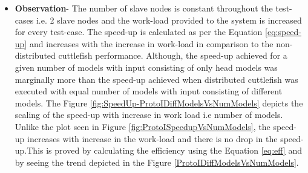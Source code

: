 \begin{enumerate}
\begin{itemize}
\item{\textbf{Observation}}-  The number of slave nodes is constant throughout the test-cases i.e. 2 slave nodes and the work-load provided to the system is increased for every test-case. The speed-up is calculated as per the Equation \ref{eq:speed-up} and increases with the increase in work-load in comparison to the non-distributed cuttlefish performance. Although, the speed-up achieved for a given number of models with input consisting of only head models was marginally more than the speed-up achieved when distributed cuttlefish was executed with equal number of models with input consisting of different models. The Figure \ref{fig:SpeedUp-ProtoIDiffModelsVsNumModels} depicts the scaling of the speed-up with increase in work load i.e number of models. Unlike the plot seen in Figure \ref{fig:ProtoISpeedupVsNumModels}, the speed-up increases with increase in the work-load and there is no drop in the speed-up.This is proved by calculating the efficiency using the Equation \ref{eq:eff} and by seeing the trend depicted in the Figure \ref{ProtoIDiffModelsVsNumModels}. 
\end{itemize}
\end{enumerate}

